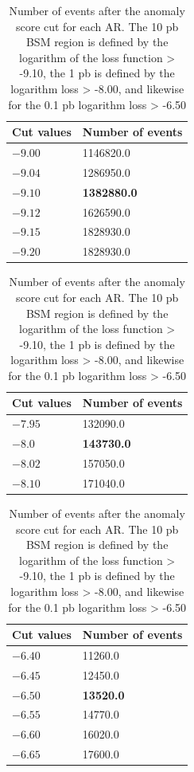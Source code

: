 \begin{table}[h!]
    \begin{small}
    \begin{center}	
\begin{tabular}{ |l|l| }
\hline
Cut values & Number of events   \\
\hline	
$-9.00$ & 1146820.0     \\ \hline
$-9.04$ & 1286950.0 \\ \hline
\textbf{$-9.10$} & \textbf{1382880.0}    \\ \hline
$-9.12$ & 1626590.0 \\ \hline
$-9.15$ & 1828930.0  \\ \hline
$-9.20$ & 1828930.0  \\ \hline
\end{tabular}
\begin{tabular}{ |l|l| }
\hline
Cut values & Number of events   \\
\hline
$-7.95$ & 132090.0  \\ \hline
\textbf{$-8.0$} & \textbf{143730.0}     \\ \hline
$-8.02$ & 157050.0     \\ \hline
$-8.10$ & 171040.0     \\ \hline
\end{tabular}
\begin{tabular}{ |l|l| }
\hline
Cut values & Number of events   \\
\hline
$-6.40$ & 11260.0    \\ \hline
$-6.45$ & 12450.0 \\ \hline
\textbf{$-6.50$}  & \textbf{13520.0}  \\ \hline
$-6.55$ & 14770.0   \\ \hline
$-6.60$ & 16020.0   \\ \hline
$-6.65$ & 17600.0   \\ \hline
\end{tabular}
\end{center}
\end{small}
\caption{Number of events after the anomaly score cut for each AR. The 10 pb BSM region is defined by the logarithm of the loss function > -9.10, the 1 pb is defined by the logarithm loss > -8.00, and likewise for the 0.1 pb logarithm loss > -6.50 }
\label{tab:test-score-cut}
\end{table}
\newpage

